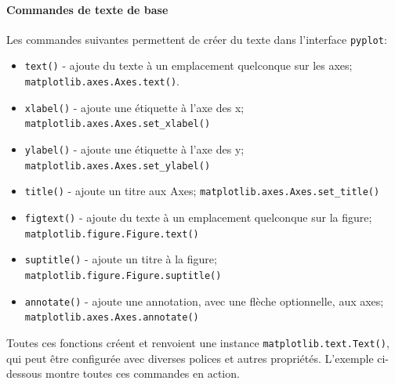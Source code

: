 \documentclass[%
oneside,                 %
final,                   %
10pt,french]{article}
\begin{document}
\paragraph{Commandes de texte de base}
Les commandes suivantes permettent de créer du texte dans l'interface \texttt{pyplot}:
\begin{itemize}
\item \texttt{text()} - ajoute du texte à un emplacement quelconque sur les axes; \texttt{matplotlib.axes.Axes.text()}.

\item \texttt{xlabel()} - ajoute une étiquette à l'axe des x; \Verb!matplotlib.axes.Axes.set_xlabel()!

\item \texttt{ylabel()} - ajoute une étiquette à l'axe des y; \Verb!matplotlib.axes.Axes.set_ylabel()!

\item \texttt{title()} - ajoute un titre aux Axes; \Verb!matplotlib.axes.Axes.set_title()!

\item \texttt{figtext()} - ajoute du texte à un emplacement quelconque sur la figure; \texttt{matplotlib.figure.Figure.text()}

\item \texttt{suptitle()} - ajoute un titre à la figure; \texttt{matplotlib.figure.Figure.suptitle()}

\item \texttt{annotate()} - ajoute une annotation, avec une flèche optionnelle, aux axes; \texttt{matplotlib.axes.Axes.annotate()}
\end{itemize}

\noindent
Toutes ces fonctions créent et renvoient une instance \texttt{matplotlib.text.Text()}, qui peut être configurée avec diverses polices et autres propriétés. L'exemple ci-dessous montre toutes ces commandes en action.
\end{document}
